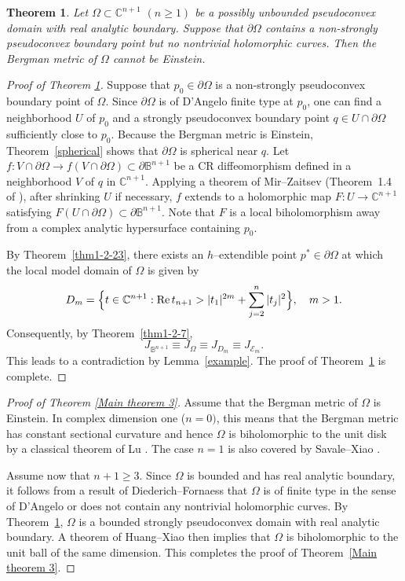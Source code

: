 \documentclass[a4paper,centertags,oneside,12pt]{amsart}
\newtheorem{theorem}{Theorem}[section]
\numberwithin{equation}{section}
\begin{document}
\begin{theorem}\label{Main theorem 3-1}
Let $\Omega\subset \mathbb C^{n+1}$ $(n\ge 1)$ be a possibly unbounded pseudoconvex domain with real analytic boundary. Suppose that $\partial \Omega$ contains a non-strongly pseudoconvex boundary point but no  nontrivial holomorphic curves. Then the Bergman metric of $\Omega$ cannot be Einstein.
\end{theorem}





\begin{proof}[Proof of Theorem \ref{Main theorem 3-1}]
Suppose that $p_0 \in \partial \Omega$ is a non-strongly pseudoconvex boundary point of $\Omega$. Since $\partial \Omega$ is of D'Angelo finite type at $p_0$, one can find a neighborhood $U$ of $p_0$ and a strongly pseudoconvex boundary point $q \in U \cap \partial \Omega$ sufficiently close to $p_0 $. 
Because the Bergman metric is Einstein, Theorem~\ref{spherical} shows that $\partial \Omega$ is spherical near $q$.  
Let $f \colon V \cap \partial \Omega \to f(V \cap \partial \Omega) \subset \partial \mathbb B^{n+1}$ be a CR diffeomorphism defined in a neighborhood $V$ of $q$ in $\mathbb C^{n+1}$. 
Applying  a theorem of Mir--Zaitsev (Theorem~1.4 of \cite{MZ21}), after shrinking $U$ if necessary, $f$ extends to a holomorphic map $F \colon U \to \mathbb C^{n+1}$ satisfying $F(U \cap \partial \Omega) \subset \partial \mathbb B^{n+1}$. 
Note that $F$ is a local biholomorphism away from a complex analytic hypersurface containing $p_0$. 

By Theorem~\ref{thm1-2-23}, there exists an $h$--extendible point $p^* \in \partial \Omega$ at which the local model domain of $\Omega$ is given by
\[
D_m = \Bigl\{ t \in \mathbb C^{n+1} : \operatorname{Re} t_{n+1} > |t_1|^{2m} + \sum_{j=2}^{n} |t_j|^2 \Bigr\}, \quad m > 1.
\]
Consequently, by Theorem~\ref{thm1-2-7},
\[
J_{\mathbb B^{n+1}} \equiv J_{\Omega} \equiv J_{D_m} \equiv J_{\mathcal E_m}.
\]
This leads to a contradiction by Lemma~\ref{example}. The proof of Theorem~\ref{Main theorem 3-1} is complete.
\end{proof}

\begin{proof}[Proof of Theorem \ref{Main theorem 3}]
Assume that the Bergman metric of $\Omega$ is Einstein. In complex dimension one ($n=0)$, this means that the Bergman metric has constant sectional curvature and hence $\Omega$ is biholomorphic to the unit disk by a classical theorem of Lu \cite{Lu66}. The case $n=1$ is also covered by Savale--Xiao \cite{SX25}. 

Assume now that $n+1 \ge 3$. 
Since $\Omega$ is bounded and has real analytic boundary, it follows from a result of Diederich--Fornaess \cite{DF78} that $\Omega$ is of finite type in the sense of D'Angelo or does not contain any nontrivial holomorphic curves. By Theorem~\ref{Main theorem 3-1}, 
$\Omega$ is a bounded strongly pseudoconvex domain with real analytic boundary. 
A theorem of Huang--Xiao \cite{HX21} then implies that $\Omega$ is biholomorphic to the unit ball of the same dimension. 
This completes the proof of Theorem~\ref{Main theorem 3}.
\end{proof}
\end{document}
